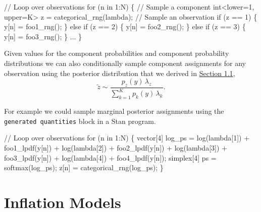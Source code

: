\documentclass[
  letterpaper,
  DIV=11,
  numbers=noendperiod]{scrartcl}
\newenvironment{Shaded}{\begin{snugshade}}{\end{snugshade}}
\newcommand{\CommentTok}[1]{\textcolor[rgb]{0.37,0.37,0.37}{#1}}
\newcommand{\ControlFlowTok}[1]{\textcolor[rgb]{0.00,0.23,0.31}{#1}}
\newcommand{\DataTypeTok}[1]{\textcolor[rgb]{0.68,0.00,0.00}{#1}}
\newcommand{\DecValTok}[1]{\textcolor[rgb]{0.68,0.00,0.00}{#1}}
\newcommand{\KeywordTok}[1]{\textcolor[rgb]{0.00,0.23,0.31}{#1}}
\newcommand{\NormalTok}[1]{\textcolor[rgb]{0.00,0.23,0.31}{#1}}
\begin{document}
\begin{Shaded}
\begin{Highlighting}[]
\CommentTok{// Loop over observations}
\ControlFlowTok{for}\NormalTok{ (n }\ControlFlowTok{in} \DecValTok{1}\NormalTok{:N) \{}
  \CommentTok{// Sample a component}
  \DataTypeTok{int}\NormalTok{\textless{}}\KeywordTok{lower}\NormalTok{=}\DecValTok{1}\NormalTok{, }\KeywordTok{upper}\NormalTok{=K\textgreater{} z = categorical\_rng(lambda);}
  \CommentTok{// Sample an observation}
  \ControlFlowTok{if}\NormalTok{ (z == }\DecValTok{1}\NormalTok{) \{}
\NormalTok{    y[n] = foo1\_rng();}
\NormalTok{  \} }\ControlFlowTok{else} \ControlFlowTok{if}\NormalTok{ (z == }\DecValTok{2}\NormalTok{) \{}
\NormalTok{    y[n] = foo2\_rng();}
\NormalTok{  \} }\ControlFlowTok{else} \ControlFlowTok{if}\NormalTok{ (z == }\DecValTok{3}\NormalTok{) \{}
\NormalTok{    y[n] = foo3\_rng();}
\NormalTok{  \} ...}
\NormalTok{\}}
\end{Highlighting}
\end{Shaded}

Given values for the component probabilities and component probability
distributions we can also conditionally sample component assignments for
any observation using the posterior distribution that we derived in
\hyperref[sec:cat_impl]{Section 1.1}, \[
\tilde{z}
\sim
\frac{ p_{z}(y) \, \lambda_{z} }
{ \sum_{k = 1}^{K} p_{k}(y) \, \lambda_{k} }.
\]

For example we could sample marginal posterior assignments using the
\texttt{generated\ quantities} block in a Stan program.

\begin{Shaded}
\begin{Highlighting}[]
\CommentTok{// Loop over observations}
\ControlFlowTok{for}\NormalTok{ (n }\ControlFlowTok{in} \DecValTok{1}\NormalTok{:N) \{}
  \DataTypeTok{vector}\NormalTok{[}\DecValTok{4}\NormalTok{] log\_ps =   log(lambda[}\DecValTok{1}\NormalTok{]) + foo1\_lpdf(y[n])}
\NormalTok{                     + log(lambda[}\DecValTok{2}\NormalTok{]) + foo2\_lpdf(y[n])}
\NormalTok{                     + log(lambda[}\DecValTok{3}\NormalTok{]) + foo3\_lpdf(y[n])}
\NormalTok{                     + log(lambda[}\DecValTok{4}\NormalTok{]) + foo4\_lpdf(y[n]);}
  \DataTypeTok{simplex}\NormalTok{[}\DecValTok{4}\NormalTok{] ps = softmax(log\_ps);}
\NormalTok{  z[n] = categorical\_rng(log\_ps);}
\NormalTok{\}}
\end{Highlighting}
\end{Shaded}

\section{Inflation Models}\label{inflation-models}
\end{document}
